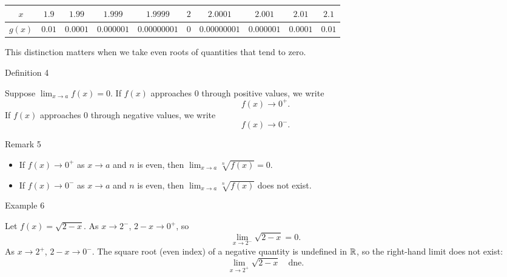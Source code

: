 \begin{center}
\small
\begin{tabular}{c|cccc|c|cccc}
\(x\)      & \(1.9\)   & \(1.99\)     & \(1.999\)       & \(1.9999\)       & \(2\) & \(2.0001\)       & \(2.001\)       & \(2.01\)     & \(2.1\)   \\
\hline
\(g(x)\)   & \(0.01\)  & \(0.0001\)   & \(0.000001\)    & \(0.00000001\)   & \(0\) & \(0.00000001\)   & \(0.000001\)    & \(0.0001\)   & \(0.01\)
\end{tabular}
\normalsize
\end{center}

This distinction matters when we take even roots of quantities that tend to zero.


\begin{definitionbox}{Definition 4}

Suppose \(\displaystyle\lim_{x \to a} f(x) = 0\). If \(f(x)\) approaches 0 through positive values, we write
\[
f(x) \to 0^{+}.
\]
If \(f(x)\) approaches 0 through negative values, we write
\[
f(x) \to 0^{-}.
\]
\end{definitionbox}


\begin{remarkbox}{Remark 5}

\begin{itemize}
    \item If \(f(x) \to 0^{+}\) as \(x \to a\) and \(n\) is even, then \(\displaystyle\lim_{x \to a} \sqrt[n]{f(x)} = 0\).
    \item If \(f(x) \to 0^{-}\) as \(x \to a\) and \(n\) is even, then \(\displaystyle\lim_{x \to a} \sqrt[n]{f(x)}\) does not exist.
\end{itemize}
\end{remarkbox}


\begin{examplebox}{Example 6}

Let \(f(x) = \sqrt{2 - x}\). As \(x \to 2^{-}\), \(2 - x \to 0^{+}\), so
\[
\lim_{x \to 2^{-}} \sqrt{2 - x} = 0.
\]
As \(x \to 2^{+}\), \(2 - x \to 0^{-}\). The square root (even index) of a negative quantity is undefined in \(\mathbb{R}\), so the right-hand limit does not exist:
\[
\lim_{x \to 2^{+}} \sqrt{2 - x} \quad \text{dne}.
\]
\end{examplebox}


